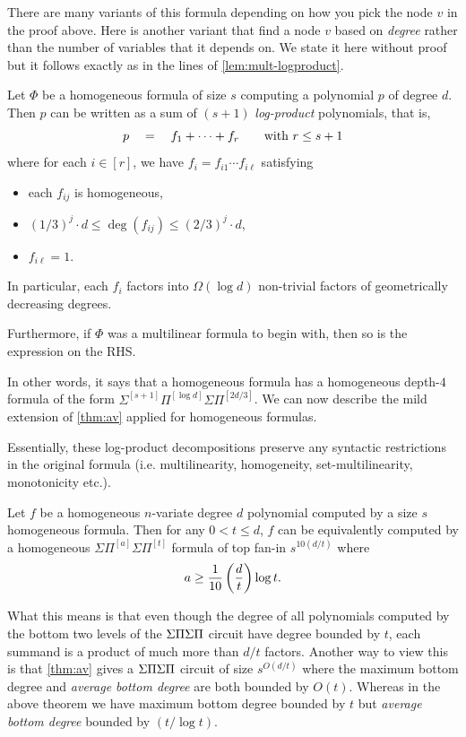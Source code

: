 There are many variants of this formula depending on how you pick the node $v$ in the proof above.
Here is another variant that find a node $v$ based on \emph{degree} rather than the number of variables that it depends on.
We state it here without proof but it follows exactly as in the lines of \autoref{lem:mult-logproduct}.

\begin{lemma}\label{lem:hom-logproduct}
  Let $\Phi$ be a homogeneous formula of size $s$ computing a polynomial $p$ of degree $d$.
Then $p$ can be written as a sum of $(s+1)$ \emph{log-product} polynomials, that is,
\begin{equation}\label{eqn:dred-formula-logproduct}
p \quad = \quad f_1 + \cdots + f_{r}\quad\quad \text{with $r \leq s+1$}
\end{equation}
where for each $i \in [r]$, we have $f_i = f_{i1} \cdots f_{i\ell}$ satisfying
\begin{itemize}
\item each $f_{ij}$ is homogeneous,
\item $(1 / 3)^j \cdot d \leq \deg(f_{ij}) \leq (2/ 3)^j \cdot d$,
\item $f_{i\ell} = 1$.
\end{itemize}
In particular, each $f_i$ factors into $\Omega(\log d)$ non-trivial factors of geometrically decreasing degrees. 

Furthermore, if $\Phi$ was a multilinear formula to begin with, then so is the expression on the RHS. 
\end{lemma}

In other words, it says that a homogeneous formula has a homogeneous depth-$4$ formula of the form $\Sigma^{[s+1]}\Pi^{[\log d]}\Sigma\Pi^{[2d/3]}$.
We can now describe the mild extension of \autoref{thm:av} applied for homogeneous formulas. 

Essentially, these log-product decompositions preserve any syntactic restrictions in the original formula (i.e. multilinearity, homogeneity, set-multilinearity, monotonicity etc.). 

\begin{theorem}\label{thm:av-formulas}
Let $f$ be a homogeneous $n$-variate degree $d$ polynomial computed by a size $s$ homogeneous formula. 
Then for any $0< t \leq d$, $f$ can be equivalently computed by a homogeneous $\Sigma\Pi^{[a]}\Sigma\Pi^{[t]}$ formula of top fan-in $s^{10(d/t)}$ where 
\[
a \geq \frac{1}{10}\left(\frac{d}{t}\right) \log t.
\]
\end{theorem}
What this means is that even though the degree of all polynomials computed by the bottom two levels of the $\Sigma\Pi\Sigma\Pi$ circuit have degree bounded by $t$, each summand is a product of much more than $d/t$ factors. Another way to view this is that \autoref{thm:av} gives a $\Sigma\Pi\Sigma\Pi$ circuit of size $s^{O(d/t)}$ where the maximum bottom degree and \emph{average bottom degree} are both bounded by $O(t)$. Whereas in the above theorem we have maximum bottom degree bounded by $t$ but \emph{average bottom degree} bounded by $(t / \log t)$. 

